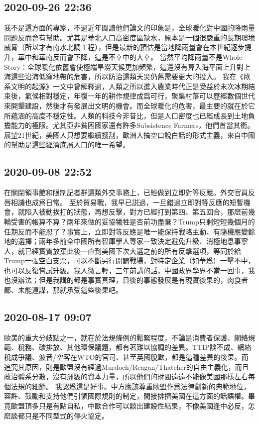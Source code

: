 \documentclass[twocolumn]{ctexart}
\begin{document}
\subsection*{2020-09-26 22:36}

我不是這方面的專家，不過近年閲讀他們論文的印象是，全球暖化對中國的降雨量問題反而會有幫助。尤其是華北人口高密度區缺水，原本是一個很嚴重的長期環境威脅（所以才有南水北調工程），但是最新的預估是當地降雨量會在本世紀逐步提升，華中和華南反而會下降，這是不幸中的大幸。
當然平均降雨量不是Whole Story：全球暖化依舊會使極端旱澇天候更加頻繁，這還沒有算入海平面上升對上海這些沿海低窪地帶的危害，所以防治這類天災仍舊需要更大的投入。
我在《歐系文明的起源》一文中曾解釋過，人類之所以進入農業時代正是受益於末次冰期結束後，氣候相對穩定，年復一年的耕作規律成爲可行，聚集村落可以歷經數個世代來開墾建設，然後才有發展出文明的機會。而全球暖化的危害，最主要的就在於它所蘊涵的高度不穩定性。人類的科技今非昔比，但是人口密度也已經成長到土地負擔能力的極限。尤其亞非貧困國家還有許多Subsistence Farmers，他們首當其衝。展望21世紀，美國人只想要繼續搜刮，歐洲人搞空口說白話的形式主義，來自中國的幫助是這些經濟底層人口的唯一希望。
\subsection*{2020-09-08 22:52}

在關閉領事館和限制記者群這類外交事務上，已經做到立即對等反應。外交官員反唇相譏也成爲日常。
至於貿易戰，我早已説過，一旦錯過立即對等反應的短暫機會，就陷入被動挨打的狀態，再想反擊，對方已經打到第四、第五回合，那麽前幾輪受害的帳算不算？兩年來做的妥協犧牲是否前功盡棄？Trump只剩短短幾個月的任期反而不能忍了？事實上，立即對等反應是唯一能保持戰略主動、有隨機應變餘地的選擇；兩年多前全中國所有智庫學人專家一致決定避免升級、消極地息事寧人，就已經實質放棄此後一直到美國下次大選之前的所有反擊選項，等同於給Trump一張空白支票，可以不斷另行開闢戰場，對特定企業（如華爲）一擊不中，也可以反復嘗試升級。我人微言輕，三年前講的話，中國政界學界不當一回事，我也沒辦法；但是我講的都是事實真理，日後的事態發展是有現實後果的，肉食者鄙、未能遠謀，那就承受這些後果吧。
\subsection*{2020-08-17 09:07}

歐美的重大分歧點之一，就在於法規條例的鬆緊程度，不論是消費者保護、網絡規範、稅務、碳排放、其他環保議題，都有著難以協調的差異。TTIP談不成、網絡稅成爭議、波音/空客在WTO的官司、甚至英國脫歐，都是這種差異的後果。而追究其原因，則是歐盟沒有經過Murdoch/Reagan/Thatcher的自由主義化，而且政治體系分散，沒有洲級的資本力量，所以他們的財閥遠遠不能像美國那樣左右每個法規的細節。
我認爲這是好事。中方應該尊重歐盟作爲法律創新的典範地位，容許、鼓勵和支持他們引領國際規則的制定，間接排擠美國在這方面的話語權。畢竟歐盟頂多只是有點自私，中歐合作可以談出建設性結果，不像美國逢中必反，怎麽談都只是不同型式的停火協定。
\end{document}
